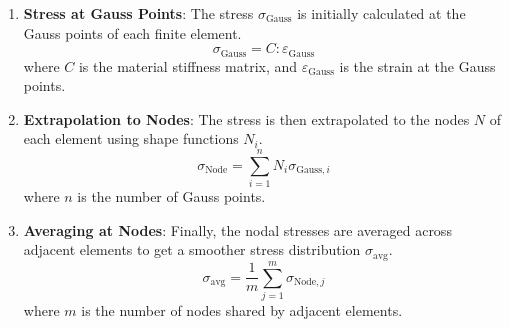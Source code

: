 \documentclass[twoside,twocolumn,10pt]{article}
\begin{document}
\begin{enumerate}
    \item \textbf{Stress at Gauss Points}: The stress \( \sigma_{\text{Gauss}} \) is initially calculated at the Gauss points of each finite element.
    \[
    \sigma_{\text{Gauss}} = C : \varepsilon_{\text{Gauss}}
    \]
    where \( C \) is the material stiffness matrix, and \( \varepsilon_{\text{Gauss}} \) is the strain at the Gauss points.

    \item \textbf{Extrapolation to Nodes}: The stress is then extrapolated to the nodes \( N \) of each element using shape functions \( N_i \).
    \[
    \sigma_{\text{Node}} = \sum_{i=1}^{n} N_i \sigma_{\text{Gauss}, i}
    \]
    where \( n \) is the number of Gauss points.

    \item \textbf{Averaging at Nodes}: Finally, the nodal stresses are averaged across adjacent elements to get a smoother stress distribution \( \sigma_{\text{avg}} \).
    \[
    \sigma_{\text{avg}} = \frac{1}{m} \sum_{j=1}^{m} \sigma_{\text{Node}, j}
    \]
    where \( m \) is the number of nodes shared by adjacent elements.
\end{enumerate}



 
\end{document}
